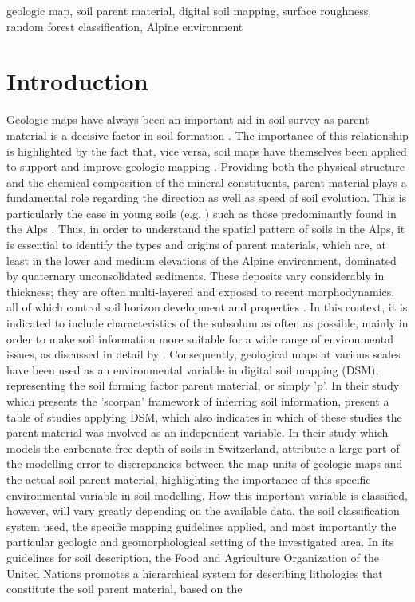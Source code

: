 \documentclass[preprint,12pt,authoryear]{elsarticle}
\begin{document}
\begin{frontmatter}
\begin{keyword}
geologic map, soil parent material, digital soil mapping, surface roughness, random forest classification, Alpine environment
\end{keyword}

\end{frontmatter}

\linenumbers

\section{Introduction}


Geologic maps have always been an important aid in soil survey as parent material is a decisive factor in soil formation \citep{Jenny1941}. The importance of this relationship is highlighted by the fact that, vice versa, soil maps have themselves been applied to support and improve geologic mapping \citep{Brevik2015}. Providing both the physical structure and the chemical composition of the mineral constituents, parent material plays a fundamental role regarding the direction as well as speed of soil evolution.  This is particularly the case in young soils (e.g. \cite{Schaetzl2000}) such as those predominantly found in the Alps \citep{Geitner2017}.  Thus, in order to understand the spatial pattern of soils in the Alps, it is essential to identify  the types and origins of parent materials, which are, at least in the lower and medium elevations of the Alpine environment, dominated by quaternary unconsolidated sediments.  These deposits vary considerably in thickness; they are often multi-layered and exposed to recent morphodynamics, all of which control soil horizon development and properties \citep{Phillips2008}. In this context, it is indicated to include characteristics of the subsolum as often as possible, mainly in order to make soil information more suitable for a wide range of environmental issues, as discussed in detail by \cite{Juilleret2016}. Consequently, geological maps at various scales have been used as an environmental variable in digital soil mapping (DSM), representing the soil forming factor parent material, or simply 'p'. In their study  which presents the 'scorpan' framework of inferring soil information, \cite{McBratney2003} present a table of studies applying DSM, which also indicates in which of these studies the parent material was involved as an independent variable. In their study which models the carbonate-free depth of soils in Switzerland,  \cite{Fracek2013} attribute a large part of the modelling error to discrepancies between the map units of geologic maps and the actual soil parent material, highlighting the importance of this specific environmental variable in soil modelling. How this important variable is classified, however, will vary greatly depending on the available data, the soil classification system used, the specific mapping guidelines applied, and most importantly the particular geologic and geomorphological setting of the investigated area. In its guidelines for soil description, the Food and Agriculture Organization of the United Nations promotes a hierarchical system for describing lithologies that constitute the soil parent material, based on the 
\end{document}
